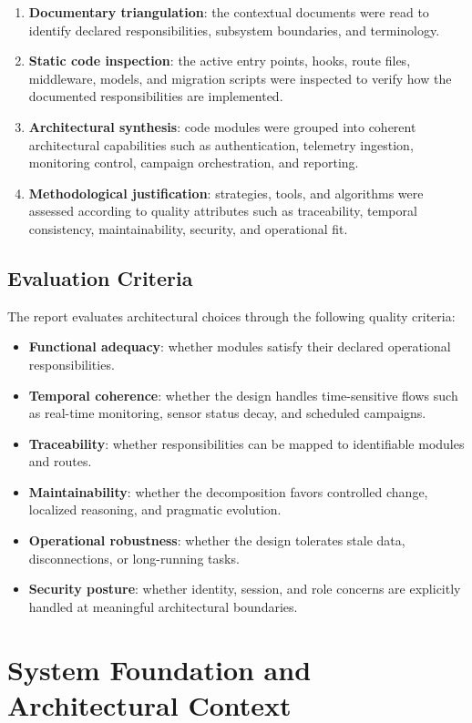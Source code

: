 \documentclass[11pt,a4paper]{article}
\begin{document}
\begin{enumerate}
  \item \textbf{Documentary triangulation}: the contextual documents were read to identify declared responsibilities, subsystem boundaries, and terminology.
  \item \textbf{Static code inspection}: the active entry points, hooks, route files, middleware, models, and migration scripts were inspected to verify how the documented responsibilities are implemented.
  \item \textbf{Architectural synthesis}: code modules were grouped into coherent architectural capabilities such as authentication, telemetry ingestion, monitoring control, campaign orchestration, and reporting.
  \item \textbf{Methodological justification}: strategies, tools, and algorithms were assessed according to quality attributes such as traceability, temporal consistency, maintainability, security, and operational fit.
\end{enumerate}

\subsection{Evaluation Criteria}
The report evaluates architectural choices through the following quality criteria:

\begin{itemize}
  \item \textbf{Functional adequacy}: whether modules satisfy their declared operational responsibilities.
  \item \textbf{Temporal coherence}: whether the design handles time-sensitive flows such as real-time monitoring, sensor status decay, and scheduled campaigns.
  \item \textbf{Traceability}: whether responsibilities can be mapped to identifiable modules and routes.
  \item \textbf{Maintainability}: whether the decomposition favors controlled change, localized reasoning, and pragmatic evolution.
  \item \textbf{Operational robustness}: whether the design tolerates stale data, disconnections, or long-running tasks.
  \item \textbf{Security posture}: whether identity, session, and role concerns are explicitly handled at meaningful architectural boundaries.
\end{itemize}

\section{System Foundation and Architectural Context}
\end{document}
